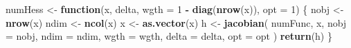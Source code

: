 \documentclass[
  12pt,
]{article}
\newenvironment{Shaded}{\begin{snugshade}}{\end{snugshade}}
\newcommand{\AttributeTok}[1]{\textcolor[rgb]{0.13,0.29,0.53}{#1}}
\newcommand{\ControlFlowTok}[1]{\textcolor[rgb]{0.13,0.29,0.53}{\textbf{#1}}}
\newcommand{\DecValTok}[1]{\textcolor[rgb]{0.00,0.00,0.81}{#1}}
\newcommand{\FunctionTok}[1]{\textcolor[rgb]{0.13,0.29,0.53}{\textbf{#1}}}
\newcommand{\NormalTok}[1]{#1}
\newcommand{\OtherTok}[1]{\textcolor[rgb]{0.56,0.35,0.01}{#1}}
\newcommand{\SpecialCharTok}[1]{\textcolor[rgb]{0.81,0.36,0.00}{\textbf{#1}}}
\begin{document}
\begin{Shaded}
\begin{Highlighting}[]
\NormalTok{numHess }\OtherTok{\textless{}{-}} \ControlFlowTok{function}\NormalTok{(x,}
\NormalTok{                    delta,}
                    \AttributeTok{wgth =} \DecValTok{1} \SpecialCharTok{{-}} \FunctionTok{diag}\NormalTok{(}\FunctionTok{nrow}\NormalTok{(x)),}
                    \AttributeTok{opt =} \DecValTok{1}\NormalTok{) \{}
\NormalTok{  nobj }\OtherTok{\textless{}{-}} \FunctionTok{nrow}\NormalTok{(x)}
\NormalTok{  ndim }\OtherTok{\textless{}{-}} \FunctionTok{ncol}\NormalTok{(x)}
\NormalTok{  x }\OtherTok{\textless{}{-}} \FunctionTok{as.vector}\NormalTok{(x)}
\NormalTok{  h }\OtherTok{\textless{}{-}} \FunctionTok{jacobian}\NormalTok{(}
\NormalTok{    numFunc,}
\NormalTok{    x,}
    \AttributeTok{nobj =}\NormalTok{ nobj,}
    \AttributeTok{ndim =}\NormalTok{ ndim,}
    \AttributeTok{wgth =}\NormalTok{ wgth,}
    \AttributeTok{delta =}\NormalTok{ delta,}
    \AttributeTok{opt =}\NormalTok{ opt}
\NormalTok{  )}
  \FunctionTok{return}\NormalTok{(h)}
\NormalTok{\}}


\end{Highlighting}
\end{Shaded}
\end{document}
